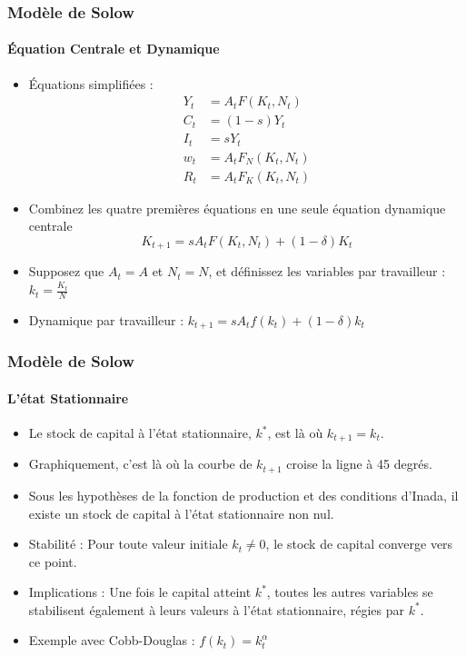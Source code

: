 \documentclass{beamer}
\begin{document}
\begin{frame}
    \frametitle{Modèle de Solow}
    \framesubtitle{Équation Centrale et Dynamique}
    \begin{itemize}
        \item Équations simplifiées :
        \begin{align*}
            Y_t &= A_t F(K_t, N_t) \\
            C_t &= (1 - s)Y_t \\
            I_t &= sY_t \\
            w_t &= A_t F_N(K_t, N_t) \\
            R_t &= A_t F_K(K_t, N_t)
        \end{align*}
        \item Combinez les quatre premières équations en une seule équation dynamique centrale
        \pause
        \[ K_{t+1} = sA_t F(K_t, N_t) + (1 - \delta)K_t \]
        \item Supposez que \( A_t = A \) et \( N_t = N \), et
        définissez les variables par travailleur : \( k_t = \frac{K_t}{N} \)
        \item Dynamique par travailleur : \( k_{t+1} = sA_t f(k_t) + (1 - \delta)k_t \)
    \end{itemize}
\end{frame}

\begin{frame}
    \frametitle{Modèle de Solow}
    \framesubtitle{L'état Stationnaire}
    \begin{itemize}
        \item Le stock de capital à l'état stationnaire, \( k^* \), est là où \( k_{t+1} = k_t \).
        \item Graphiquement, c'est là où la courbe de \( k_{t+1} \) croise la ligne à 45 degrés.
        \item Sous les hypothèses de la fonction de production et des conditions d'Inada, il existe un stock de capital à l'état stationnaire non nul.
        \item Stabilité : Pour toute valeur initiale \( k_t \neq 0 \), le stock de capital converge vers ce point.
        \item Implications : Une fois le capital atteint \( k^* \), toutes les autres variables se stabilisent également à leurs valeurs à l'état stationnaire, régies par \( k^* \).
        \item Exemple avec Cobb-Douglas : \( f(k_t) = k_t^\alpha \)
    \end{itemize}
\end{frame}
\end{document}
